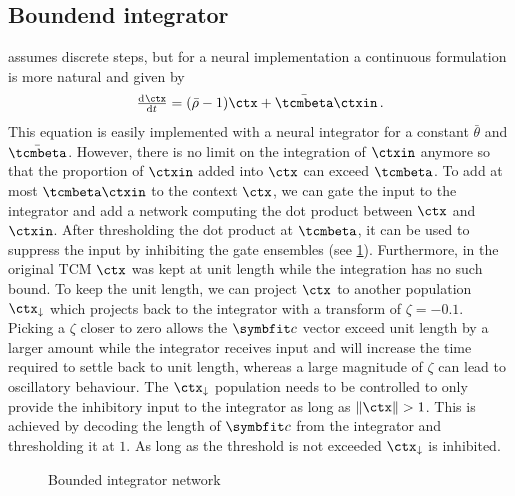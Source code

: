 \subsection{Boundend integrator}
 assumes discrete steps, but for a neural implementation a continuous formulation is more natural and given by
\begin{equation}
    \od{\ctx}{t} = (\bar{\rho} - 1) \ctx + \bar{\tcmbeta} \ctxin\,\text{.}
\end{equation}
This equation is easily implemented with a neural integrator for a constant $\bar{\theta}$ and $\bar{\tcmbeta}$.
However, there is no limit on the integration of $\ctxin$ anymore so that the proportion of $\ctxin$ added into $\ctx$ can exceed $\tcmbeta$.
To add at most $\tcmbeta \ctxin$ to the context $\ctx$, we can gate the input to the integrator and add a network computing the dot product between $\ctx$ and $\ctxin$.
After thresholding the dot product at $\tcmbeta$, it can be used to suppress the input by inhibiting the gate ensembles (see \cref{fig:ctx-bounded-integrator}).
Furthermore, in the original TCM $\ctx$ was kept at unit length while the integration has no such bound.
To keep the unit length, we can project $\ctx$ to another population $\ctx_{\downarrow}$ which projects back to the integrator with a transform of $\zeta = -0.1$.
Picking a $\zeta$ closer to zero allows the $\vc c$ vector exceed unit length by a larger amount while the integrator receives input and will increase the time required to settle back to unit length, whereas a large magnitude of $\zeta$ can lead to oscillatory behaviour.
The $\ctx_{\downarrow}$ population needs to be controlled to only provide the inhibitory input to the integrator as long as $\lVert\ctx\rVert > 1$.
This is achieved by decoding the length of $\vc c$ from the integrator and thresholding it at $1$.
As long as the threshold is not exceeded $\ctx_{\downarrow}$ is inhibited.
\begin{figure}
    \centering
    \caption{Bounded integrator network}\label{fig:ctx-bounded-integrator}
\end{figure}

